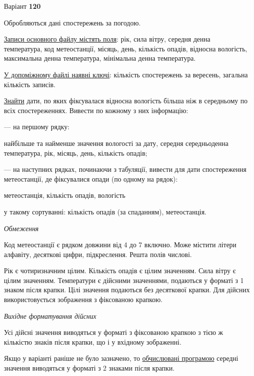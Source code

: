 \documentclass[11pt, ukrainian]{article}
\begin{document}
\par
\newpage
{\center Варіант  \No \textbf { 120 }\par}
\bigskip
Обробляються дані спостережень за погодою. 

\underline{Записи основного файлу містять поля}: рік, сила вітру, середня денна температура, код метеостанції, місяць, день, кількість опадів, відносна вологість, максимальна денна температура, мінімальна денна температура.

\underline{У допоміжному файлі наявні ключі}: кількість спостережень за вересень, загальна кількість записів.

\underline{Знайти} дати, по яких фіксувалася відносна вологість більша ніж в середньому по всіх спостереженнях. Вивести по кожному з них інформацію:\par
{\noindent}--- на першому рядку:\par
найбільше та найменше значення вологості за дату, середня середньоденна температура, рік, місяць, день, кількість опадів;

{\noindent}--- на наступних рядках, починаючи з табуляції, вивести для дати спостереження метеостанції, де фіксувалися опади (по одному на рядок):\par
метеостанція, кількість опадів, вологість

{\noindent}у такому сортуванні: кількість опадів (за спаданням), метеостанція.


\bigskip\textit{Обмеження}

Код метеостанції є рядком довжини від 4 до 7 включно.
Може містити літери алфавіту, десяткові цифри, підкреслення. Решта полів числові.

Рік є чотиризначним цілим.
Кількість опадів є цілим значенням.
Сила вітру є цілим значенням.
Температури є дійсними значеннями, подаються у форматі з 1 знаком після крапки.
Цілі значення подаються без десяткової крапки.
Для дійсних використовується зображення з фіксованою крапкою.

\textit{Вихідне форматування дійсних}

Усі дійсні значення виводяться у форматі з фіксованою крапкою з тією ж кількістю знаків після крапки, що і у вхідному зображенні.

Якщо у варіанті раніше не було зазначено, то \underline{обчислювані програмою} середні значення виводяться у форматі з 2 знаками після крапки.
\end{document}
